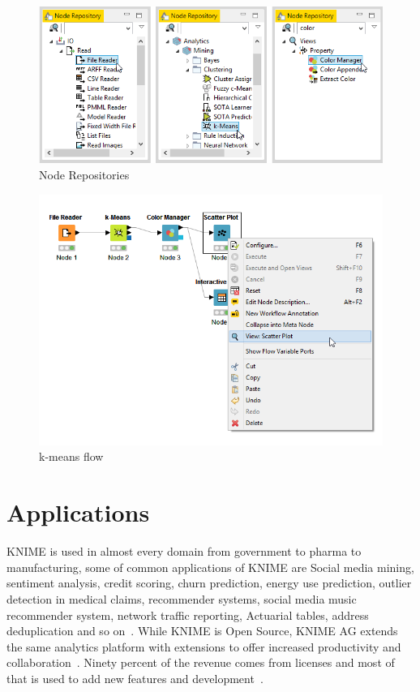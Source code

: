 \begin{figure}[!ht]
	\centering\includegraphics[width=\columnwidth]{../images/node_repositories.png}
	\caption{Node Repositories~\cite{hid-sp18-517-wf}}
\label{fig:noderep}
\end{figure}

\begin{figure}[!ht]
	\centering\includegraphics[width=\columnwidth]{../images/kmeans_flow.png}
	\caption{k-means flow~\cite{hid-sp18-517-wf}}
\label{fig:kmean}
\end{figure}


\section{Applications}

KNIME is used in almost every domain from government to pharma to manufacturing,
some of common applications of KNIME are Social media mining, sentiment
analysis, credit scoring, churn prediction, energy use prediction, outlier
detection in medical claims, recommender systems, social media music recommender
system, network traffic reporting, Actuarial tables, address deduplication and
so on~\cite{hid-sp18-517-applications}.  While KNIME is Open Source, KNIME AG
extends the same analytics platform with extensions to offer increased
productivity and collaboration~\cite{hid-sp18-517-opensource}.  Ninety percent
of the revenue comes from licenses and most of that is used to add new features
and development~\cite{hid-sp18-517-opensource}.

